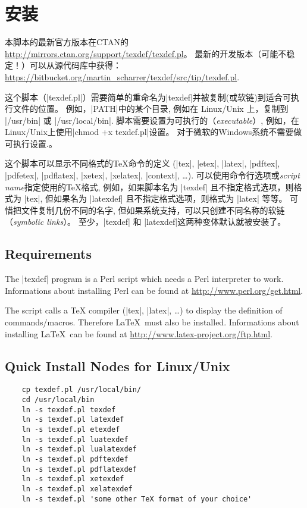 \documentclass{article}
\begin{document}
\section{安装}\label{sec:install}

本脚本的最新官方版本在CTAN的\url{http://mirrors.ctan.org/support/texdef/texdef.pl}。
最新的开发版本（可能不稳定！）可以从源代码库中获得：
\url{https://bitbucket.org/martin_scharrer/texdef/src/tip/texdef.pl}.

这个脚本（|texdef.pl|）需要简单的重命名为|texdef|并被复制(或软链)到适合可执行文件的位置。
例如，|PATH|中的某个目录, 例如在 Linux/Unix 上，复制到 |/usr/bin| 或 |/usr/local/bin|.
脚本需要设置为可执行的（\emph{executable}）, 例如，在Linux/Unix上使用|chmod +x texdef.pl|设置。
对于微软的Windows系统不需要做可执行设置.。

这个脚本可以显示不同格式的TeX命令的定义
(|tex|, |etex|, |latex|, |pdftex|, |pdfetex|, |pdflatex|, |xetex|, |xelatex|, |context|, \ldots).
可以使用命令行选项或\emph{script name}指定使用的TeX格式,
例如，如果脚本名为 |texdef| 且不指定格式选项，则格式为 |tex|, 但如果名为 |latexdef| 且不指定格式选项，则格式为
 |latex| 等等。
可惜把文件复制几份不同的名字, 但如果系统支持，可以只创建不同名称的软链（\emph{symbolic links}）。
至少，|texdef| 和 |latexdef|这两种变体默认就被安装了。


\subsection*{Requirements}

The |texdef| program is a Perl script which needs a Perl interpreter to work.
Informations about installing Perl can be found at \url{http://www.perl.org/get.html}.

The script calls a TeX compiler (|tex|, |latex|, \ldots) to display the definition of commands/macros.
Therefore \LaTeX\ must also be installed.
Informations about installing \LaTeX\ can be found at \url{http://www.latex-project.org/ftp.html}.




\subsection*{Quick Install Nodes for Linux/Unix}

\begin{verbatim}
    cp texdef.pl /usr/local/bin/
    cd /usr/local/bin
    ln -s texdef.pl texdef
    ln -s texdef.pl latexdef
    ln -s texdef.pl etexdef
    ln -s texdef.pl luatexdef
    ln -s texdef.pl lualatexdef
    ln -s texdef.pl pdftexdef
    ln -s texdef.pl pdflatexdef
    ln -s texdef.pl xetexdef
    ln -s texdef.pl xelatexdef
    ln -s texdef.pl 'some other TeX format of your choice'
\end{verbatim}
\end{document}
